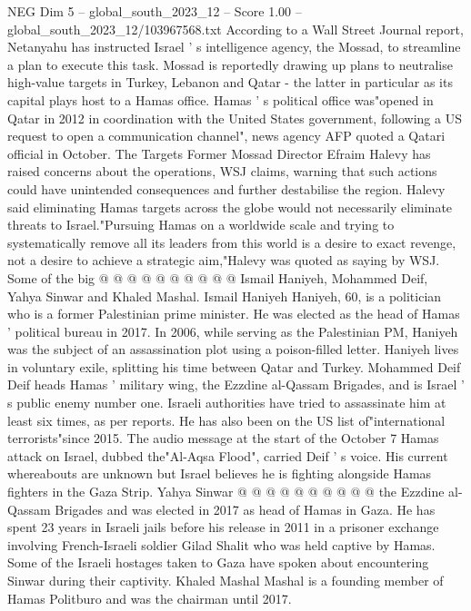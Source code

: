 \begin{textsample}{NEG Dim 5 – global\_south\_2023\_12 – Score 1.00 – global\_south\_2023\_12/103967568.txt}  \label{ex:f5_neg_235}
According to a Wall Street Journal report, Netanyahu has instructed Israel ' s intelligence agency, the Mossad, to streamline a plan to execute this task.
Mossad is reportedly drawing up plans to neutralise high-value targets in Turkey, Lebanon and Qatar - the latter in particular as its capital plays host to a Hamas office.
Hamas ' s political office was"opened in Qatar in 2012 in coordination with the United States government, following a US request to open a communication channel", news agency AFP quoted a Qatari official in October.
The Targets Former Mossad Director Efraim Halevy has raised concerns about the operations, WSJ claims, warning that such actions could have unintended consequences and further destabilise the region.
Halevy said eliminating Hamas targets across the globe would not necessarily eliminate threats to Israel."Pursuing Hamas on a worldwide scale and trying to systematically remove all its leaders from this world is a desire to exact revenge, not a desire to achieve a strategic aim,"Halevy was quoted as saying by WSJ.
Some of the big @ @ @ @ @ @ @ @ @ @ Ismail Haniyeh, Mohammed Deif, Yahya Sinwar and Khaled Mashal.
Ismail Haniyeh Haniyeh, 60, is a politician who is a former Palestinian prime minister.
He was elected as the head of Hamas ' political bureau in 2017.
In 2006, while serving as the Palestinian PM, Haniyeh was the subject of an assassination plot using a poison-filled letter.
Haniyeh lives in voluntary exile, splitting his time between Qatar and Turkey.
Mohammed Deif Deif heads Hamas ' military wing, the Ezzdine al-Qassam Brigades, and is Israel ' s public enemy number one.
Israeli authorities have tried to assassinate him at least six times, as per reports.
He has also been on the US list of"international terrorists"since 2015.
The audio message at the start of the October 7 Hamas attack on Israel, dubbed the"Al-Aqsa Flood", carried Deif ' s voice.
His current whereabouts are unknown but Israel believes he is fighting alongside Hamas fighters in the Gaza Strip.
Yahya Sinwar @ @ @ @ @ @ @ @ @ @ the Ezzdine al-Qassam Brigades and was elected in 2017 as head of Hamas in Gaza.
He has spent 23 years in Israeli jails before his release in 2011 in a prisoner exchange involving French-Israeli soldier Gilad Shalit who was held captive by Hamas.
Some of the Israeli hostages taken to Gaza have spoken about encountering Sinwar during their captivity.
Khaled Mashal Mashal is a founding member of Hamas Politburo and was the chairman until 2017.

\end{textsample}
